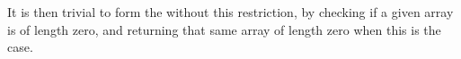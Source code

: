 It is then trivial to form the  without this restriction, by 
checking if a given array is of length zero, and returning that same array of
length zero when this is the case.

\begin{code}[hide]%
%
\>[2]\AgdaSpace{}%
\AgdaSymbol{:}\AgdaSpace{}%
\AgdaSpace{}%
\AgdaSymbol{(}\AgdaSpace{}%
\AgdaSymbol{)}\AgdaSpace{}%
\AgdaSpace{}%
\AgdaSpace{}%
\AgdaSpace{}%
\AgdaSymbol{(}\AgdaSpace{}%
\AgdaSymbol{)}\AgdaSpace{}%
\<%
\\
%
\>[2]\AgdaSpace{}%
\AgdaSymbol{\{}\AgdaSymbol{\}}\AgdaSpace{}%
\AgdaSpace{}%
\AgdaSpace{}%
\AgdaSpace{}%
\<%
\\
%
\>[2]\AgdaSpace{}%
\AgdaSymbol{|}\AgdaSpace{}%
%
\>[12]\AgdaSpace{}%
\AgdaSymbol{=}\AgdaSpace{}%
\<%
\\
%
\>[2]\AgdaSpace{}%
\AgdaSymbol{|}\AgdaSpace{}%
%
\>[13]\AgdaSpace{}%
\AgdaSymbol{=}\AgdaSpace{}%
\AgdaSpace{}%
\AgdaSpace{}%
\AgdaSpace{}%
\AgdaSpace{}%
\<%
\end{code}


